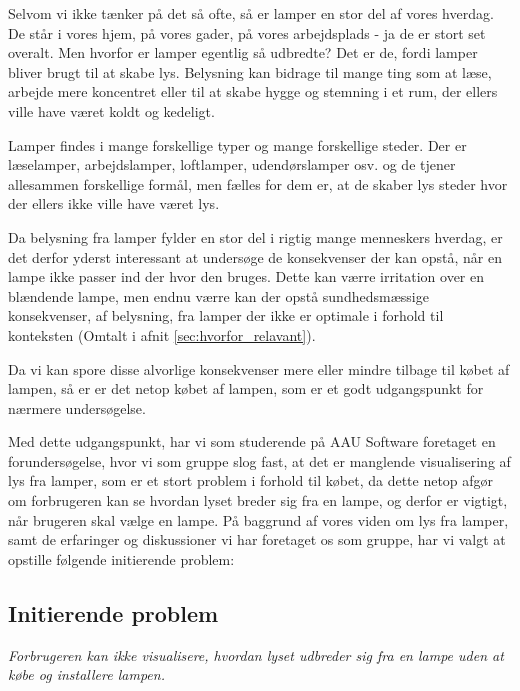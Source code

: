 Selvom vi ikke tænker på det så ofte, så er lamper en stor del af vores hverdag. De står i vores hjem, på vores gader, på vores arbejdsplads - ja de er stort set overalt. Men hvorfor er lamper egentlig så udbredte? Det er de, fordi lamper bliver brugt til at skabe lys. Belysning kan bidrage til mange ting som at læse, arbejde mere koncentret eller til at skabe hygge og stemning i et rum, der ellers ville have været koldt og kedeligt. 

Lamper findes i mange forskellige typer og mange forskellige steder. Der er læselamper, arbejdslamper, loftlamper, udendørslamper osv. og de tjener allesammen forskellige formål, men fælles for dem er, at de skaber lys steder hvor der ellers ikke ville have været lys. 

Da belysning fra lamper fylder en stor del i rigtig mange menneskers hverdag, er det derfor yderst interessant at undersøge de konsekvenser der kan opstå, når en lampe ikke passer ind der hvor den bruges. Dette kan værre irritation over en blændende lampe, men endnu værre kan der opstå sundhedsmæssige konsekvenser, af belysning, fra lamper der ikke er optimale i forhold til konteksten (Omtalt i afnit \ref{sec:hvorfor_relavant}).

Da vi kan spore disse alvorlige konsekvenser mere eller mindre tilbage til købet af lampen, så er er det netop købet af lampen, som er et godt udgangspunkt for nærmere undersøgelse.

Med dette udgangspunkt, har vi som studerende på AAU Software foretaget en forundersøgelse, hvor vi som gruppe slog fast, at det er manglende visualisering af lys fra lamper, som er et stort problem i forhold til købet, da dette netop afgør om forbrugeren kan se hvordan lyset breder sig fra en lampe, og derfor er vigtigt, når brugeren skal vælge en lampe. På baggrund af vores viden om lys fra lamper, samt de erfaringer og diskussioner vi har foretaget os som gruppe, har vi valgt at opstille følgende initierende problem:

\subsection{Initierende problem}
\textit{Forbrugeren kan ikke visualisere, hvordan lyset udbreder sig fra en lampe uden at købe og installere lampen.}